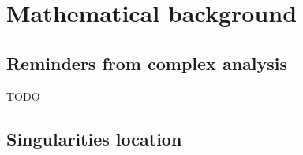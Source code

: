 \documentclass[../main.tex]{subfiles}
\begin{document}
\chapter{Mathematical background}

\section{Reminders from complex analysis}

TODO

%
%	
%
%	
%	
%



\section{Singularities location}

%
%
%
%
%
%
%
\end{document}
